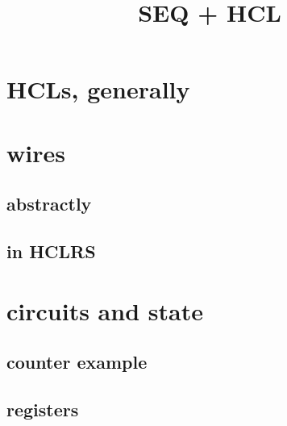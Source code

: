 \graphicspath{{./figures/}}
\usepackage{xspace}
\usepackage{cancel}
\title{SEQ + HCL}
\date{}


\begin{frame}
    \titlepage
\end{frame}


\usetikzlibrary{calc,chains,shapes.misc,shapes.callouts,shapes.geometric,shapes.gates.logic.US,circuits.logic.US}
\providecommand{\vemphA}[1]{\myemph<2>{#1}}
\providecommand{\vemphB}[1]{\myemph<3>{#1}}
\providecommand{\vemphC}[1]{\myemph<4>{#1}}

\section{HCLs, generally}


\section{wires}

\subsection{abstractly}

\subsection{in HCLRS}


\section{circuits and state}

\subsection{counter example}




\subsection{registers}

